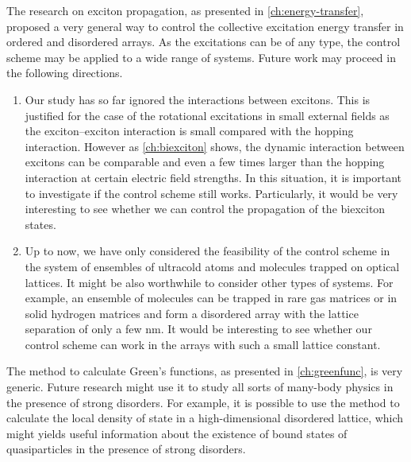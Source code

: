 The research on exciton propagation, as presented in \autoref{ch:energy-transfer}, proposed a very general way to control
the collective excitation energy transfer in ordered and disordered arrays. As the excitations can be of any type, the control 
scheme may be applied to a wide range of systems. Future work may proceed in the following directions.
\begin{enumerate}
%
\item Our study has so far ignored the interactions between excitons. This is justified for the case of the rotational 
excitations in small external fields as the exciton--exciton interaction is small compared with the hopping interaction. 
However as \autoref{ch:biexciton} shows, the dynamic interaction between excitons can be comparable and even a few 
times larger than the hopping interaction at certain electric field strengths. In this situation, it is important to investigate
 if the control scheme still works. Particularly, it would be very interesting to see whether we can control the propagation
 of the biexciton states. 
%
\item Up to now, we have only considered the feasibility of the control scheme in the system of ensembles of ultracold
 atoms and molecules trapped on optical lattices. It might be also worthwhile to consider other types of systems. For 
 example, an ensemble of molecules can be trapped in rare gas matrices or in solid hydrogen matrices and form a disordered array with the lattice separation of only a few nm. It would be interesting to see whether our control scheme
 can work in the arrays with such a small lattice constant. 
\end{enumerate}

The method to calculate Green's functions, as presented in \autoref{ch:greenfunc}, is very generic. Future research might
use it to study all sorts of many-body physics in the presence of strong disorders. For example, it is possible to
use the method to calculate the local density of state in a  high-dimensional disordered lattice, which might yields useful information about the 
existence of bound states of quasiparticles in the presence of strong disorders. 


 
